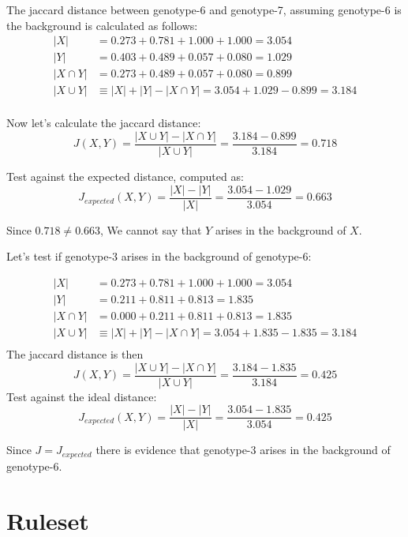 \documentclass{book}
\begin{document}
The jaccard distance between genotype-6 and genotype-7, assuming genotype-6 is the background is calculated as follows:
\newline
\begin{align*}
 |X| &= 0.273+0.781+1.000+1.000 = 3.054 \\
 |Y| &= 0.403+0.489+0.057+0.080=1.029 \\
 |X \cap Y|&=0.273+0.489+0.057+0.080=0.899 \\
 |X \cup Y| &\equiv |X|+|Y|-|X \cap Y|= 3.054+1.029-0.899=3.184 \\
\end{align*}
\newline

Now let's calculate the jaccard distance:
\[
J(X,Y)=\frac{|X\cup Y|-|X \cap Y|}{|X \cup Y|}=\frac{3.184-0.899}{3.184}=0.718
\]

Test against the expected distance, computed as:
\[
J_{expected}(X,Y) = \frac{|X|-|Y|}{|X|}=\frac{3.054-1.029}{3.054}=0.663
\]

Since $0.718\ne 0.663$, We cannot say that $Y$ arises in the background of $X$.


Let's test if genotype-3 arises in the background of genotype-6:

\begin{align*}
|X| &= 0.273+0.781+1.000+1.000 = 3.054 \\
|Y| &= 0.211+0.811+0.813=1.835 \\
|X \cap Y|&=0.000+0.211+0.811+0.813=1.835 \\
|X \cup Y| &\equiv |X|+|Y|-|X \cap Y|= 3.054+1.835-1.835=3.184 \\
\end{align*}
The jaccard distance is then
\[
J(X,Y)=\frac{|X\cup Y|-|X \cap Y|}{|X \cup Y|}=\frac{3.184-1.835}{3.184}=0.425
\]
Test against the ideal distance:
\[
J_{expected}(X,Y) = \frac{|X|-|Y|}{|X|}=\frac{3.054-1.835}{3.054}=0.425
\]

Since $J = J_{expected}$ there is evidence that genotype-3 arises in the background of genotype-6.



\section{Ruleset}
\end{document}
